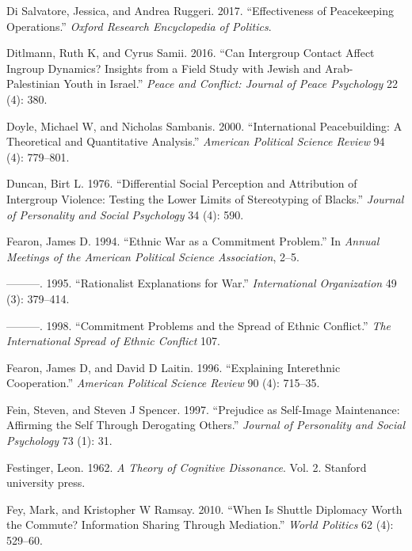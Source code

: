 \documentclass[11pt]{article}
\begin{document}
\leavevmode\hypertarget{ref-di2017effectiveness}{}%
Di Salvatore, Jessica, and Andrea Ruggeri. 2017. ``Effectiveness of
Peacekeeping Operations.'' \emph{Oxford Research Encyclopedia of
Politics}.

\leavevmode\hypertarget{ref-ditlmann2016can}{}%
Ditlmann, Ruth K, and Cyrus Samii. 2016. ``Can Intergroup Contact Affect
Ingroup Dynamics? Insights from a Field Study with Jewish and
Arab-Palestinian Youth in Israel.'' \emph{Peace and Conflict: Journal of
Peace Psychology} 22 (4): 380.

\leavevmode\hypertarget{ref-doyle2000international}{}%
Doyle, Michael W, and Nicholas Sambanis. 2000. ``International
Peacebuilding: A Theoretical and Quantitative Analysis.'' \emph{American
Political Science Review} 94 (4): 779--801.

\leavevmode\hypertarget{ref-duncan1976differential}{}%
Duncan, Birt L. 1976. ``Differential Social Perception and Attribution
of Intergroup Violence: Testing the Lower Limits of Stereotyping of
Blacks.'' \emph{Journal of Personality and Social Psychology} 34 (4):
590.

\leavevmode\hypertarget{ref-fearon1994ethnic}{}%
Fearon, James D. 1994. ``Ethnic War as a Commitment Problem.'' In
\emph{Annual Meetings of the American Political Science Association},
2--5.

\leavevmode\hypertarget{ref-fearon1995rationalist}{}%
---------. 1995. ``Rationalist Explanations for War.''
\emph{International Organization} 49 (3): 379--414.

\leavevmode\hypertarget{ref-fearon1998commitment}{}%
---------. 1998. ``Commitment Problems and the Spread of Ethnic
Conflict.'' \emph{The International Spread of Ethnic Conflict} 107.

\leavevmode\hypertarget{ref-fearon1996explaining}{}%
Fearon, James D, and David D Laitin. 1996. ``Explaining Interethnic
Cooperation.'' \emph{American Political Science Review} 90 (4): 715--35.

\leavevmode\hypertarget{ref-fein1997prejudice}{}%
Fein, Steven, and Steven J Spencer. 1997. ``Prejudice as Self-Image
Maintenance: Affirming the Self Through Derogating Others.''
\emph{Journal of Personality and Social Psychology} 73 (1): 31.

\leavevmode\hypertarget{ref-festinger1962cognitiveDissonance}{}%
Festinger, Leon. 1962. \emph{A Theory of Cognitive Dissonance}. Vol. 2.
Stanford university press.

\leavevmode\hypertarget{ref-fey2010shuttle}{}%
Fey, Mark, and Kristopher W Ramsay. 2010. ``When Is Shuttle Diplomacy
Worth the Commute? Information Sharing Through Mediation.'' \emph{World
Politics} 62 (4): 529--60.
\end{document}

